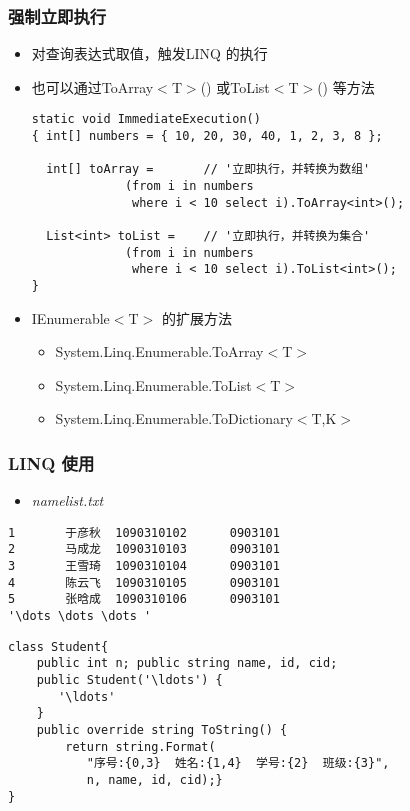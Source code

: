 \begin{frame}[fragile]
\frametitle{强制立即执行}
\begin{itemize}
\item 对查询表达式取值，触发LINQ 的执行
\item 也可以通过ToArray$<$T$>$() 或ToList$<$T$>$() 等方法
\begin{lstlisting}[escapeinside='']
static void ImmediateExecution()
{ int[] numbers = { 10, 20, 30, 40, 1, 2, 3, 8 };

  int[] toArray =       // '立即执行，并转换为数组'
             (from i in numbers 
              where i < 10 select i).ToArray<int>();

  List<int> toList =    // '立即执行，并转换为集合'
             (from i in numbers
              where i < 10 select i).ToList<int>();
}
\end{lstlisting}
\item IEnumerable$<$T$>$ 的扩展方法
\begin{itemize}
\item System.Linq.Enumerable.ToArray$<$T$>$
\item System.Linq.Enumerable.ToList$<$T$>$
\item System.Linq.Enumerable.ToDictionary$<$T,K$>$
\end{itemize}
\end{itemize}
\end{frame}


\begin{frame}[fragile]
\frametitle{LINQ 使用}
\begin{itemize}
\item \textit{namelist.txt}
\end{itemize}
\begin{lstlisting}[escapeinside='']
1       于彦秋  1090310102      0903101
2       马成龙  1090310103      0903101
3       王雪琦  1090310104      0903101
4       陈云飞  1090310105      0903101
5       张晗成  1090310106      0903101
'\dots \dots \dots ' 
\end{lstlisting}

\begin{lstlisting}[escapeinside='']
class Student{
    public int n; public string name, id, cid;
    public Student('\ldots') {
       '\ldots'
    }
    public override string ToString() {
        return string.Format(
           "序号:{0,3}  姓名:{1,4}  学号:{2}  班级:{3}",
           n, name, id, cid);}
}
\end{lstlisting}

\end{frame}


